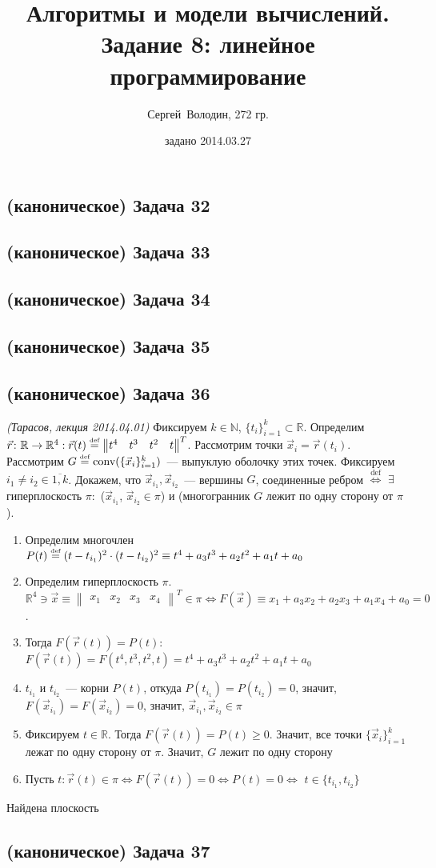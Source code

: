 \documentclass[a4paper]{article}
\date{задано 2014.03.27}
\author{Сергей~Володин, 272 гр.}
\title{Алгоритмы и модели вычислений.\\Задание 8: линейное программирование}
\def\conv{{\mbox{conv}}}
\def\eqdef{\overset{\mbox{\tiny def}}{=}}
\newcommand{\NN}{\mathbb{N}}
\newcommand{\RR}{\mathbb{R}}
\begin{document}
\maketitle
\subsection*{(каноническое) Задача 32}
\subsection*{(каноническое) Задача 33}
\subsection*{(каноническое) Задача 34}
\subsection*{(каноническое) Задача 35}
\subsection*{(каноническое) Задача 36}
{\em (Тарасов, лекция 2014.04.01)}\newline
Фиксируем $k\in\NN$, $\{t_i\}_{i=1}^k\subset\RR$. Определим $\vec{r}\colon \RR\to \RR^4: \vec{r}(t)\eqdef \begin{Vmatrix}
t^4 & t^3 & t^2 & t
\end{Vmatrix}^T
$. Рассмотрим точки $\vec{x}_i=\vec{r}(t_i)$. Рассмотрим $G\eqdef\conv(\{\vec{x}_i\}_{i=1}^k)$~--- выпуклую оболочку этих точек. Фиксируем $i_1\neq i_2\in\overline{1,k}$. Докажем, что $\vec{x}_{i_1},\vec{x}_{i_2}$~--- вершины $G$, соединенные ребром $\overset{\mbox{def}}{\Leftrightarrow}$ $\exists$ гиперплоскость $\pi\colon$ ($\vec{x}_{i_1}$, $\vec{x}_{i_2}\in\pi$) и (многогранник $G$ лежит по одну сторону от $\pi$).\begin{enumerate}
\item Определим многочлен $P(t)\eqdef (t-t_{i_1})^2\cdot(t-t_{i_2})^2\equiv t^4+a_3t^3+a_2t^2+a_1t+a_0$
\item Определим гиперплоскость $\pi$. $\RR^4\ni\vec{x}\equiv \begin{Vmatrix}
x_1 & x_2 & x_3 & x_4\end{Vmatrix}^T\in\pi\Leftrightarrow F(\vec{x})\equiv x_1+a_3x_2+a_2x_3+a_1x_4+a_0=0$.
\item Тогда $F(\vec{r}(t))=P(t)$: $F(\vec{r}(t))=F(t^4,t^3,t^2,t)=t^4+a_3t^3+a_2t^2+a_1t+a_0$
\item $t_{i_1}$ и $t_{i_2}$~--- корни $P(t)$, откуда $P(t_{i_1})=P(t_{i_2})=0$, значит, $F(\vec{x}_{i_1})=F(\vec{x}_{i_2})=0$, значит, $\vec{x}_{i_1},\vec{x}_{i_2}\in\pi$
\item Фиксируем $t\in\RR$. Тогда $F(\vec{r}(t))=P(t)\geqslant 0$. Значит, все точки $\{\vec{x}_i\}_{i=1}^k$ лежат по одну сторону от $\pi$. Значит, $G$ лежит по одну сторону 
\item Пусть $t\colon \vec{r}(t)\in\pi\Leftrightarrow F(\vec{r}(t))=0\Leftrightarrow P(t)=0\Leftrightarrow$ $t\in\{t_{i_1},t_{i_2}\}$
\end{enumerate}
Найдена плоскость
\subsection*{(каноническое) Задача 37}
\end{document}
